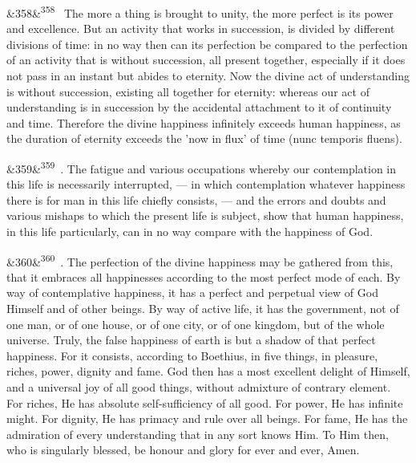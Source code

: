 \documentclass[12pt]{article}
\newcommand{\para}[1][]{\par\noindent\ifx&#1&\else\textsuperscript{\footnotesize #1}~\fi}
\begin{document}
\para[358] The more a thing is brought to unity, the more perfect is its power and excellence. But an activity that works in succession, is divided by different divisions of time: in no way then can its perfection be compared to the perfection of an activity that is without succession, all present together, especially if it does not pass in an instant but abides to eternity. Now the divine act of understanding is without succession, existing all together for eternity: whereas our act of understanding is in succession by the accidental attachment to it of continuity and time. Therefore the divine happiness infinitely exceeds human happiness, as the duration of eternity exceeds the 'now in flux' of time (nunc temporis fluens).

\para[359] 6. The fatigue and various occupations whereby our contemplation in this life is necessarily interrupted, --- in which contemplation whatever happiness there is for man in this life chiefly consists, --- and the errors and doubts and various mishaps to which the present life is subject, show that human happiness, in this life particularly, can in no way compare with the happiness of God.

\para[360] 7. The perfection of the divine happiness may be gathered from this, that it embraces all happinesses according to the most perfect mode of each. By way of contemplative happiness, it has a perfect and perpetual view of God Himself and of other beings. By way of active life, it has the government, not of one man, or of one house, or of one city, or of one kingdom, but of the whole universe. Truly, the false happiness of earth is but a shadow of that perfect happiness. For it consists, according to Boethius, in five things, in pleasure, riches, power, dignity and fame. God then has a most excellent delight of Himself, and a universal joy of all good things, without admixture of contrary element. For riches, He has absolute self-sufficiency of all good. For power, He has infinite might. For dignity, He has primacy and rule over all beings. For fame, He has the admiration of every understanding that in any sort knows Him. To Him then, who is singularly blessed, be honour and glory for ever and ever, Amen.
\end{document}
